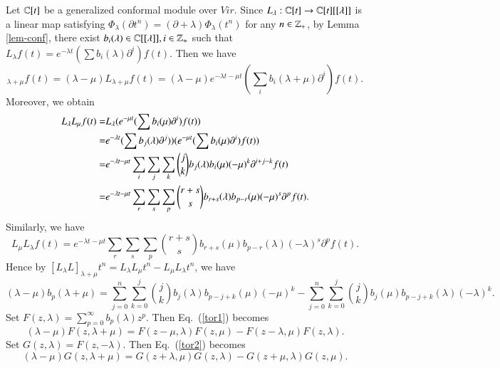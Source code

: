 \documentclass[12pt]{amsart}
\begin{document}
Let $\mathbb{C}[t]$ be a generalized conformal module over $Vir$.
Since $L_\lambda: \mathbb{C}[t]\rightarrow \mathbb{C}[t][[\lambda]]$ is a linear
map satisfying $\Phi_\lambda(\partial t^n)=(\partial+\lambda)\Phi_\lambda(t^n)$ for any $n\in \mathbb{Z}_+$, by Lemma \ref{lem-conf},
there
exist
$b_i(\lambda)\in\mathbb{C}[[\lambda]],i\in\mathbb{Z}_+$ such that $L_\lambda f(t)=e^{-\lambda t}(\sum b_i(\lambda)\partial^i) f(t)$.
Then we have
\begin{equation*}
[L_\lambda L]_{\lambda+\mu}f(t)=(\lambda-\mu)L_{\lambda+\mu}f(t)=(\lambda-\mu)e^{-\lambda t-\mu t}(\sum_i b_i(\lambda+\mu)\partial^i) f(t).
\end{equation*}
Moreover, we obtain
\begin{equation*}
\aligned
L_\lambda L_{\mu}f(t)=&L_\lambda(e^{-\mu t}(\sum b_i(\mu)\partial^i) f(t))\\
=&e^{-\lambda t}(\sum b_j(\lambda)\partial^j))(e^{-\mu t}(\sum b_i(\mu)\partial^i) f(t))\\
=&e^{-\lambda t-\mu t}\sum_i\sum_j\sum_k \binom{j}{k}b_j(\lambda)b_i(\mu)(-\mu)^k\partial^{i+j-k} f(t)\\
=&e^{-\lambda t-\mu t}\sum_r\sum_s\sum_p \binom{r+s}{s}b_{r+s}(\lambda)b_{p-r}(\mu)(-\mu)^s\partial^{p} f(t).
\endaligned
\end{equation*}
Similarly, we have
\begin{equation*}
L_{\mu}L_\lambda f(t)=e^{-\lambda t-\mu t}\sum_r\sum_s\sum_p \binom{r+s}{s}b_{r+s}(\mu)b_{p-r}(\lambda)(-\lambda)^s\partial^{p} f(t).
\end{equation*}
Hence by $[L_\lambda L]_{\lambda+\mu}t^n=L_\lambda L_{\mu}t^n-L_{\mu}L_\lambda t^n$, we have
\begin{equation}\label{tor1}
(\lambda-\mu)b_p(\lambda+\mu)=
\sum_{j=0}^n\sum_{k=0}^j\binom{j}{k}b_{j}(\lambda)b_{p-j+k}(\mu)(-\mu)^k-\sum_{j=0}^n\sum_{k=0}^j\binom{j}{k}b_{j}(\mu)b_{p-j+k}(\lambda)(-\lambda)^k.
\end{equation}
Set $F(z, \lambda)=\sum_{p=0}^\infty b_p(\lambda)z^p$. Then Eq.~(\ref{tor1}) becomes
\begin{equation}\label{tor2}
(\lambda-\mu)F(z,\lambda+\mu)=F(z-\mu,\lambda)F(z,\mu)-F(z-\lambda,\mu)F(z,\lambda).
\end{equation}
Set $G(z,\lambda)=F(z,-\lambda)$. Then Eq.~(\ref{tor2}) becomes
\begin{equation}\label{tor3}
(\lambda-\mu)G(z,\lambda+\mu)=G(z+\lambda,\mu)G(z,\lambda)-G(z+\mu,\lambda)G(z,\mu).
\end{equation}
\end{document}
